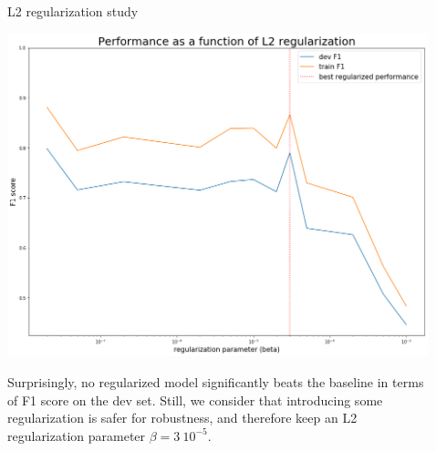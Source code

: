 \documentclass[final]{beamer}
\newlength{\sepwid}
\newlength{\onecolwid}
\newlength{\twocolwid}
\begin{document}
\begin{frame}[t]
\begin{columns}[t]
\begin{column}{\twocolwid}
\begin{columns}[t,totalwidth=\twocolwid]
\begin{column}{\onecolwid}

\begin{block}{L2 regularization study}

\begin{center}
\includegraphics[scale=0.5]{figs/l2_graph.png}
\end{center}

Surprisingly, no regularized model significantly beats the baseline in terms of F1 score on the dev set. Still, we consider that introducing some regularization is safer for robustness, and therefore keep an L2 regularization parameter $\beta=3~10^{-5}$.

\end{block}


\end{column} %

\end{columns} %

\end{column} %

\begin{column}{\sepwid}\end{column} %

\begin{column}{\onecolwid} %


\end{column}
\end{columns}
\end{frame}
\end{document}
